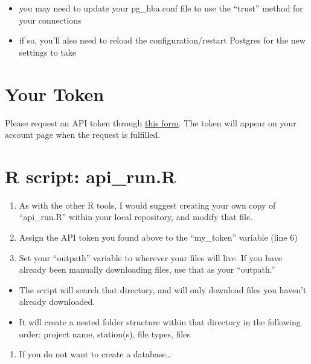\documentclass[
]{book}
\providecommand{\tightlist}{%
  \setlength{\itemsep}{0pt}\setlength{\parskip}{0pt}}
\begin{document}
\begin{itemize}
\tightlist
\item
  you may need to update your pg\_hba.conf file to use the ``trust'' method for your connections
\item
  if so, you'll also need to reload the configuration/restart Postgres for the new settings to take
\end{itemize}

\hypertarget{your-token}{%
\section{Your Token}\label{your-token}}

Please request an API token through \href{https://celltracktech.com/support-radio-api/}{this form}. The token will appear on your account page when the request is fulfilled.

\hypertarget{r-script-api_run.r}{%
\section{R script: api\_run.R}\label{r-script-api_run.r}}

\begin{enumerate}
\def\labelenumi{\arabic{enumi}.}
\tightlist
\item
  As with the other R tools, I would suggest creating your own copy of ``api\_run.R'' within your local repository, and modify that file.
\item
  Assign the API token you found above to the ``my\_token'' variable (line 6)\\
\item
  Set your ``outpath'' variable to wherever your files will live. If you have already been manually downloading files, use that as your ``outpath.''
\end{enumerate}

\begin{itemize}
\tightlist
\item
  The script will search that directory, and will only download files you haven't already downloaded.
\item
  It will create a nested folder structure within that directory in the following order: project name, station(s), file types, files
\end{itemize}

\begin{enumerate}
\def\labelenumi{\arabic{enumi}.}
\setcounter{enumi}{3}
\tightlist
\item
  If you do not want to create a database\ldots{}
\end{enumerate}
\end{document}
